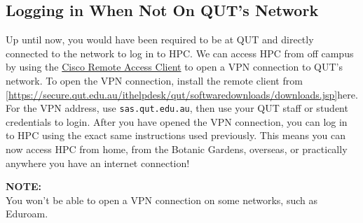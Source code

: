 \subsection{Logging in When Not On QUT's Network}
%
%
Up until now, you would have been required to be at QUT and directly connected to the network to log in to HPC. We can access HPC from off campus by using the \href{https://secure.qut.edu.au/ithelpdesk/qut/softwaredownloads/downloads.jsp}{Cisco Remote Access Client} to open a VPN connection to QUT's network. To open the VPN connection, install the remote client from \ref{https://secure.qut.edu.au/ithelpdesk/qut/softwaredownloads/downloads.jsp}{here}. For the VPN address, use \texttt{sas.qut.edu.au}, then use your QUT staff or student credentials to login. After you have opened the VPN connection, you can log in to HPC using the exact same instructions used previously. This means you can now access HPC from home, from the Botanic Gardens, overseas, or practically anywhere you have an internet connection!
%
%
\par
\begin{story}
  \textbf{NOTE:}
  \\
  You won't be able to open a VPN connection on some networks, such as Eduroam.
\end{story}


